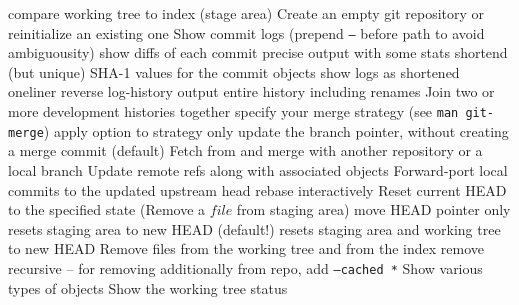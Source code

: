 	{compare working tree to index (stage area)}
	{Create an empty git repository or reinitialize an existing one}
	{Show commit logs (prepend {\tt --} before path to avoid ambiguousity)}
	{show diffs of each commit}
	{precise output with some stats}
	{shortend (but unique) SHA-1 values for the commit objects }
	{show logs as shortened oneliner}
	{reverse log-history output}
	{entire history including renames}
	{Join two or more development histories together}
	{specify your merge strategy (see {\tt man git-merge})}
	{apply option to strategy}
	{only update the branch pointer, without creating a merge commit (default)}
	{Fetch from and merge with another re\-pository or a local branch}
	{Update remote refs along with associated objects}
	{Forward-port local commits to the updated upstream head}
	{rebase interactively}
	{Reset current HEAD to the specified state (Remove a $file$ from staging area)}
	{move HEAD pointer only}
	{resets staging area to new HEAD (default!)}
	{resets staging area and working tree to new HEAD}
	{Remove files from the working tree and from the index}
	{remove recursive -- for removing additionally from repo, add
{\tt --cached *}}
	{Show various types of objects}
	{Show the working tree status}

